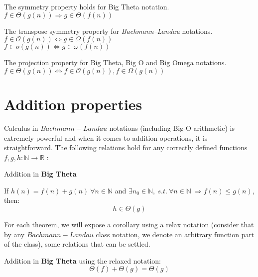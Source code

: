 \begin{theorem}
    The symmetry property holds for Big Theta notation. \\  $ f \in \Theta(g(n)) \Rightarrow g \in \Theta(f(n)) $
\end{theorem}

\begin{theorem}
    The transpose symmetry property for \textit{Bachmann–Landau} notations.  \\  $ f \in \mathcal{O}(g(n)) \Leftrightarrow g \in \Omega(f(n)) $
    \\  $ f \in o(g(n)) \Leftrightarrow g \in \omega(f(n)) $
\end{theorem}

\begin{theorem}
    The projection property for Big Theta, Big O and Big Omega notations. \\  $ f \in \Theta(g(n)) \Leftrightarrow f \in \mathcal{O}(g(n)), f \in \Omega(g(n)) $
\end{theorem}


\section{Addition properties}
Calculus in $Bachmann-Landau$ notations (including Big-O arithmetic) is extremely powerful and when it comes to addition operations, it is straightforward. The following relations hold for any correctly defined functions $f, g, h:\mathbb{N}\longrightarrow\mathbb{R}$ :



\begin{lemma}
    Addition in \textbf{Big Theta}

    If  $ h(n) = f(n) + g(n)\  \forall n \in  \mathbb{N} $ and $\exists n_{0} \in \mathbb{N},\ s.t.\ \forall n \in \mathbb{N} \ \Rightarrow f(n) \leq g(n)$, then:
    \[  h \in \Theta(g)\]

\end{lemma}
\begin{remark}
    For each theorem, we will expose a corollary using a relax notation (consider that by any $Bachmann-Landau$ class notation, we denote an arbitrary function part of the class), some relations that can be settled.
\end{remark}
\begin{corollary}
    Addition in \textbf{Big Theta} using the relaxed notation:
    \[  \Theta(f) + \Theta(g) = \Theta(g)\]
\end{corollary}

